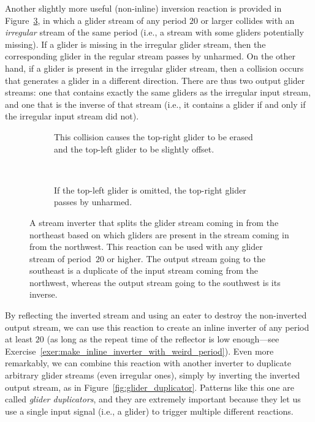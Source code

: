 Another slightly more useful (non-inline) inversion reaction is provided in Figure~\ref{fig:stream_inverter}, in which a glider stream of any period $20$ or larger collides with an \emph{irregular} stream of the same period (i.e., a stream with some gliders potentially missing). If a glider is missing in the irregular glider stream, then the corresponding glider in the regular stream passes by unharmed. On the other hand, if a glider is present in the irregular glider stream, then a collision occurs that generates a glider in a different direction. There are thus two output glider streams: one that contains exactly the same gliders as the irregular input stream, and one that is the inverse of that stream (i.e., it contains a glider if and only if the irregular input stream did not).

\begin{figure}[!htb]
	\centering
	\begin{subfigure}{.48\textwidth}
		\centering
		\caption{This collision causes the top-right glider to be erased and the top-left glider to be slightly offset.}
		\label{fig:stream_inverter_yes}
	\end{subfigure} \ \ \ \ %
	\begin{subfigure}{.48\textwidth}
		\centering
		\caption{If the top-left glider is omitted, the top-right glider passes by unharmed.}
		\label{fig:stream_inverter_no}
	\end{subfigure}
	\caption{A stream inverter that splits the glider stream coming in from the northeast based on which gliders are present in the stream coming in from the northwest. This reaction can be used with any glider stream of period~$20$ or higher. The output stream going to the southeast is a duplicate of the input stream coming from the northwest, whereas the output stream going to the southwest is its inverse.}\label{fig:stream_inverter}
\end{figure}

By reflecting the inverted stream and using an eater to destroy the non-inverted output stream, we can use this reaction to create an inline inverter of any period at least $20$ (as long as the repeat time of the reflector is low enough---see Exercise~\ref{exer:make_inline_inverter_with_weird_period}). Even more remarkably, we can combine this reaction with another inverter to duplicate arbitrary glider streams (even irregular ones), simply by inverting the inverted output stream, as in Figure~\ref{fig:glider_duplicator}. Patterns like this one are called \emph{glider duplicators}, and they are extremely important because they let us use a single input signal (i.e., a glider) to trigger multiple different reactions.

